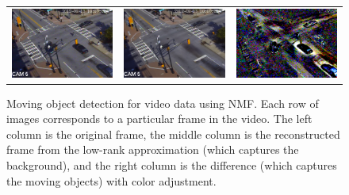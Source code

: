 \documentclass[10pt,journal,compsoc, onecolumn]{IEEEtran}
\begin{document}
\begin{figure}[th!]
\begin{tabular}{ccc}
\includegraphics[height=\hght,width=\wdth]{fig/input12000.png} &  
\includegraphics[height=\hght,width=\wdth]{fig/lr12000.png}&
\includegraphics[height=\hght,width=\wdth]{fig/err12000-edit.png} \\
\end{tabular}
\caption{Moving object detection for video data using NMF.  Each row of images corresponds to a particular frame in the video.  The left column is the original frame, the middle column is the reconstructed frame from the low-rank approximation (which captures the background), and the right column is the difference (which captures the moving objects) with color adjustment.}
\label{fig:videoresults}
\end{figure}
\end{document}
